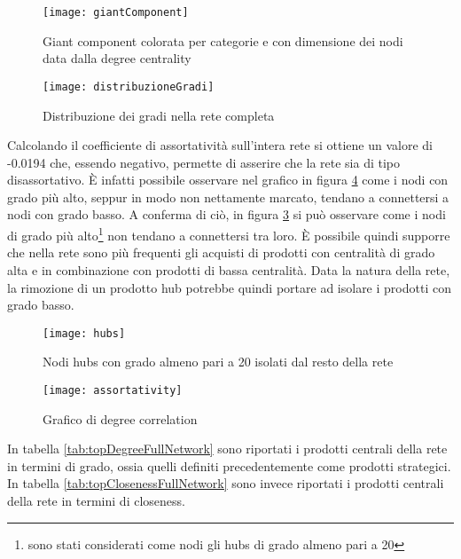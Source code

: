\begin{figure}[]
    \texttt{[image: giantComponent]}\centering
    \caption{Giant component colorata per categorie e con dimensione dei nodi data dalla degree centrality}\label{fig:giantComponent}
\end{figure}

\begin{figure}[H]
    \texttt{[image: distribuzioneGradi]}\centering
    \caption{Distribuzione dei gradi nella rete completa}\label{fig:distribuzioneGradi}
\end{figure}

Calcolando il coefficiente di assortatività sull'intera rete si ottiene un valore di -0.0194 che, essendo negativo, permette di asserire che la rete sia di tipo disassortativo. È infatti possibile osservare nel grafico in figura \ref{fig:assortativity} come i nodi  con grado più alto, seppur in modo non nettamente marcato, tendano a connettersi a nodi con grado basso. A conferma di ciò, in figura \ref{fig:hubs} si può osservare come i nodi di grado più alto\footnote{sono stati considerati come nodi gli hubs di grado almeno pari a 20} non tendano a connettersi tra loro. È possibile quindi supporre che nella rete sono più frequenti gli acquisti di prodotti con centralità di grado alta e in combinazione con prodotti di bassa centralità. Data la natura della rete, la rimozione di un prodotto hub potrebbe quindi portare ad isolare i prodotti con grado basso. 

\begin{figure}[H]
    \texttt{[image: hubs]}\centering
    \caption{Nodi hubs con grado almeno pari a 20 isolati dal resto della rete}\label{fig:hubs}
\end{figure}

\begin{figure}[H]
    \texttt{[image: assortativity]}\centering
    \caption{Grafico di degree correlation}\label{fig:assortativity}
\end{figure}

In tabella \ref{tab:topDegreeFullNetwork} sono riportati i prodotti centrali della rete in termini di grado, ossia quelli definiti precedentemente come prodotti strategici. \\
In tabella \ref{tab:topClosenessFullNetwork} sono invece riportati i prodotti centrali della rete in termini di closeness. \\



